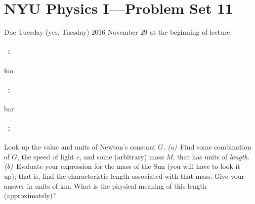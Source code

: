 \documentclass[12pt]{article}
\begin{document}
\section*{NYU Physics I---Problem Set 11}

Due Tuesday (yes, Tuesday) 2016 November 29 at the beginning of lecture.

\paragraph{\problemname~\theproblem:}%
foo

\paragraph{\problemname~\theproblem:}%
bar

\paragraph{\problemname~\theproblem:}%
Look up the value and units of Newton's constant $G$.
\textsl{(a)}~Find some combination of $G$, the speed of light $c$, and
some (arbitrary) mass $M$, that has units of \emph{length}.
\textsl{(b)}~Evaluate your expression for the mass of the Sun (you
will have to look it up); that is, find the characteristic length
associated with that mass.  Give your answer in units of km.  What is
the physical meaning of this length (approximately)?
\end{document}
